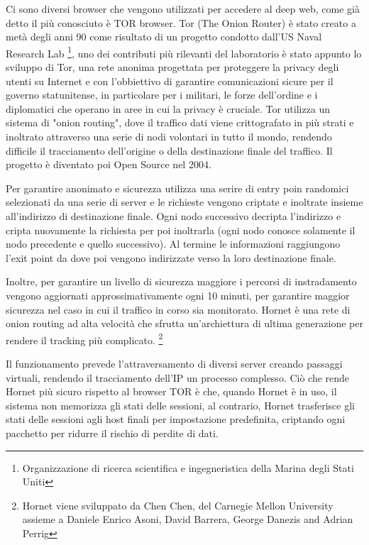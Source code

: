 Ci sono diversi browser che vengono utilizzati per accedere al deep web, come già detto il più conosciuto è TOR browser. Tor (The Onion Router) è stato creato a metà degli anni 90 come risultato di un progetto condotto dall'US Naval Research Lab \footnote{Organizzazione di ricerca scientifica e ingegneristica della Marina degli Stati Uniti}, uno dei contributi più rilevanti del laboratorio è stato appunto lo sviluppo di Tor, una rete anonima progettata per proteggere la privacy degli utenti su Internet e con l'obbiettivo di garantire comunicazioni sicure per il governo statunitense, in particolare per i militari, le forze dell'ordine e i diplomatici che operano in aree in cui la privacy è cruciale.
Tor utilizza un sistema di "onion routing", dove il traffico dati viene crittografato in più strati e inoltrato attraverso una serie di nodi volontari in tutto il mondo, rendendo difficile il tracciamento dell'origine o della destinazione finale del traffico. Il progetto è diventato poi Open Source nel 2004.

Per garantire anonimato e sicurezza utilizza una serire di entry poin randomici selezionati da una serie di server e le richieste vengono criptate e inoltrate insieme all'indirizzo di destinazione finale.
Ogni nodo successivo decripta l'indirizzo e cripta nuovamente la richiesta per poi inoltrarla (ogni nodo conosce solamente il nodo precedente e quello successivo). Al termine le informazioni raggiungono l'exit point da dove poi vengono indirizzate verso la loro destinazione finale.

\newpage

Inoltre, per garantire un livello di sicurezza maggiore i percorsi di instradamento vengono aggiornati approssimativamente ogni 10 minuti, per garantire maggior sicurezza nel caso in cui il traffico in corso sia monitorato.
Hornet è una rete di onion routing ad alta velocità che sfrutta un'archiettura di ultima generazione per rendere il tracking più complicato. \footnote{Hornet viene sviluppato da Chen Chen, del Carnegie Mellon University assieme a Daniele Enrico Asoni, David Barrera, George Danezis and Adrian Perrig}

Il funzionamento prevede l'attraversamento di diversi server creando passaggi virtuali, rendendo il tracciamento dell'IP un processo complesso. Ciò che rende Hornet più sicuro rispetto al browser TOR è che, quando Hornet è in uso, il sistema non memorizza gli stati delle sessioni, al contrario, Hornet trasferisce gli stati delle sessioni agli host finali per impostazione predefinita, criptando ogni pacchetto per ridurre il rischio di perdite di dati.

